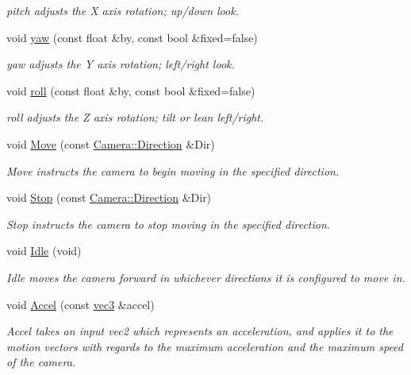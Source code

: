 \begin{DoxyCompactItemize}
\begin{DoxyCompactList}\small\item\em pitch adjusts the X axis rotation; up/down look. \end{DoxyCompactList}\item 
void \hyperlink{class_camera_a0ce7d12edbe47d9a8915d8af98d8f524}{yaw} (const float \&by, const bool \&fixed=false)
\begin{DoxyCompactList}\small\item\em yaw adjusts the Y axis rotation; left/right look. \end{DoxyCompactList}\item 
void \hyperlink{class_camera_a1ba0979fe0b2ec58085d5f9721858e5e}{roll} (const float \&by, const bool \&fixed=false)
\begin{DoxyCompactList}\small\item\em roll adjusts the Z axis rotation; tilt or lean left/right. \end{DoxyCompactList}\item 
void \hyperlink{class_camera_a421e03f93824e178d6e77ff547cd290e}{Move} (const \hyperlink{class_camera_a80cb65605322d27ad3b6d973484509ec}{Camera\-::\-Direction} \&Dir)
\begin{DoxyCompactList}\small\item\em Move instructs the camera to begin moving in the specified direction. \end{DoxyCompactList}\item 
void \hyperlink{class_camera_adf064f765f610684e0675bd67de013fd}{Stop} (const \hyperlink{class_camera_a80cb65605322d27ad3b6d973484509ec}{Camera\-::\-Direction} \&Dir)
\begin{DoxyCompactList}\small\item\em Stop instructs the camera to stop moving in the specified direction. \end{DoxyCompactList}\item 
void \hyperlink{class_camera_aec3559fe43597656629fdb00157d3c73}{Idle} (void)
\begin{DoxyCompactList}\small\item\em Idle moves the camera forward in whichever directions it is configured to move in. \end{DoxyCompactList}\item 
void \hyperlink{class_camera_a8eb4ebda2379e7289bb2bb942a2796b4}{Accel} (const \hyperlink{struct_angel_1_1vec3}{vec3} \&accel)
\begin{DoxyCompactList}\small\item\em Accel takes an input vec2 which represents an acceleration, and applies it to the motion vectors with regards to the maximum acceleration and the maximum speed of the camera. \end{DoxyCompactList}\item 

\end{DoxyCompactItemize}
